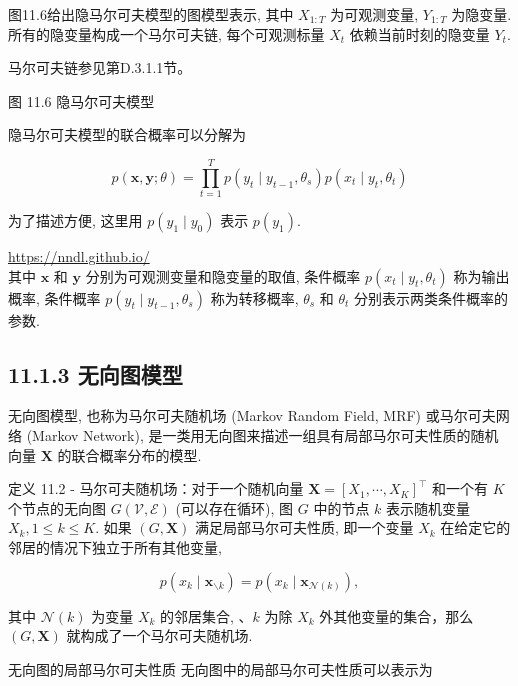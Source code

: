 \documentclass[10pt]{article}
\begin{document}
图11.6给出隐马尔可夫模型的图模型表示, 其中 $X_{1: T}$ 为可观测变量, $Y_{1: T}$ 为隐变量. 所有的隐变量构成一个马尔可夫链, 每个可观测标量 $X_{t}$ 依赖当前时刻的隐变量 $Y_{t}$.

马尔可夫链参见第D.3.1.1节。



图 11.6 隐马尔可夫模型

隐马尔可夫模型的联合概率可以分解为


\begin{equation*}
p(\boldsymbol{x}, \boldsymbol{y} ; \theta)=\prod_{t=1}^{T} p\left(y_{t} \mid y_{t-1}, \theta_{s}\right) p\left(x_{t} \mid y_{t}, \theta_{t}\right) \tag{11.14}
\end{equation*}


为了描述方便, 这里用 $p\left(y_{1} \mid y_{0}\right)$ 表示 $p\left(y_{1}\right)$.

\href{https://nndl.github.io/}{https://nndl.github.io/}\\
其中 $\boldsymbol{x}$ 和 $\boldsymbol{y}$ 分别为可观测变量和隐变量的取值, 条件概率 $p\left(x_{t} \mid y_{t}, \theta_{t}\right)$ 称为输出概率, 条件概率 $p\left(y_{t} \mid y_{t-1}, \theta_{s}\right)$ 称为转移概率, $\theta_{s}$ 和 $\theta_{t}$ 分别表示两类条件概率的参数.

\subsection*{11.1.3 无向图模型}
无向图模型, 也称为马尔可夫随机场 (Markov Random Field, MRF) 或马尔可夫网络 (Markov Network), 是一类用无向图来描述一组具有局部马尔可夫性质的随机向量 $\boldsymbol{X}$ 的联合概率分布的模型.

定义 11.2 - 马尔可夫随机场：对于一个随机向量 $\boldsymbol{X}=\left[X_{1}, \cdots, X_{K}\right]^{\top}$ 和一个有 $K$ 个节点的无向图 $G(\mathcal{V}, \mathcal{E})$ (可以存在循环), 图 $G$ 中的节点 $k$ 表示随机变量 $X_{k}, 1 \leq k \leq K$. 如果 $(G, \boldsymbol{X})$ 满足局部马尔可夫性质, 即一个变量 $X_{k}$ 在给定它的邻居的情况下独立于所有其他变量,


\begin{equation*}
p\left(x_{k} \mid \boldsymbol{x}_{\backslash k}\right)=p\left(x_{k} \mid \boldsymbol{x}_{\mathcal{N}(k)}\right), \tag{11.15}
\end{equation*}


其中 $\mathcal{N}(k)$ 为变量 $X_{k}$ 的邻居集合, $、 k$ 为除 $X_{k}$ 外其他变量的集合，那么 $(G, \boldsymbol{X})$ 就构成了一个马尔可夫随机场.

无向图的局部马尔可夫性质 无向图中的局部马尔可夫性质可以表示为
\end{document}
